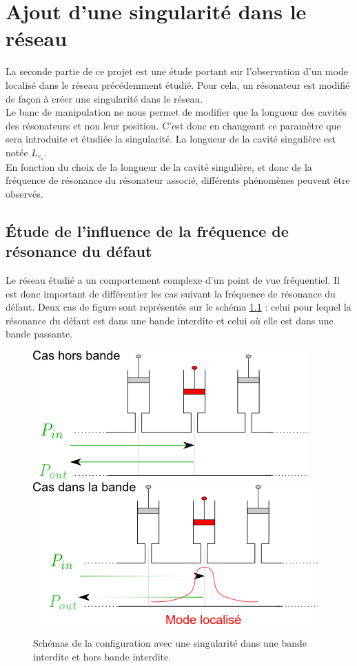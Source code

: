 \chapter{Ajout d'une singularité dans le réseau}
La seconde partie de ce projet est une étude portant sur l'observation d'un mode localisé dans le réseau précédemment étudié. Pour cela, un résonateur est modifié de façon à créer une singularité dans le réseau. \\


Le banc de manipulation ne nous permet de modifier que la longueur des cavités des résonateurs et non leur position. C'est donc en changeant ce paramètre que sera introduite et étudiée la singularité. La longueur de la cavité singulière est notée $L_{c_{s}}$.\\

En fonction du choix de la longueur de la cavité singulière, et donc de la fréquence de résonance du résonateur associé, différents phénomènes peuvent être observés. 

\section{Étude de l'influence de la fréquence de résonance du défaut}
Le réseau étudié a un comportement complexe d'un point de vue fréquentiel. Il est donc important de différentier les cas suivant la fréquence de résonance du défaut. Deux cas de figure sont représentés sur le schéma \ref{schema_singu1} : celui pour lequel la résonance du défaut est dans une bande interdite et celui où elle est dans une bande passante.

\begin{figure}[!h]
\centering
\includegraphics[scale=0.5]{images_chp2/schema_singu1.png} \hfill
\includegraphics[scale=0.5]{images_chp2/schema_singu2.png}
\caption{\label{schema_singu1} Schémas de la configuration avec une singularité dans une bande interdite  et hors bande interdite.}
\end{figure}




